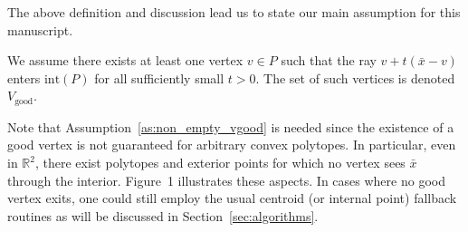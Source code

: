 The above definition and discussion lead us to state our main assumption for this manuscript.

\begin{assumption}\label{as:non_empty_vgood}
We assume there exists at least one vertex $v \in P$ such that the ray $v + t(\bar x - v)$ enters $\mathrm{int}(P)$ for all sufficiently small $t>0$. The set of such vertices is denoted $V_\text{good}$.
\end{assumption}

Note that Assumption~\ref{as:non_empty_vgood} is needed since the existence of a good vertex is not guaranteed for arbitrary convex polytopes.
In particular, even in $\mathbb{R}^2$, there exist polytopes and exterior points
for which no vertex sees $\bar x$ through the interior.
Figure~1 illustrates these aspects. In cases where no good vertex exits, one could still employ the usual centroid (or internal point) fallback routines as will be discussed in Section~\ref{sec:algorithms}.




